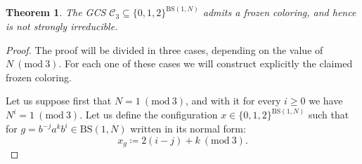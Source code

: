 \documentclass[letterpaper,10pt]{amsart}
\theoremstyle{plain}
\newtheorem{theorem}{Theorem}[section]
\newcommand{\BS}[1][N]{\mathrm{BS}(1,#1)}
\begin{document}
\begin{theorem}\label{thm:existence_frozen_3} The GCS $\mathcal{C}_3\subseteq \{0,1,2\}^{\BS}$ admits a frozen coloring, and hence is not strongly irreducible.
\end{theorem}
\begin{proof}The proof will be divided in three cases, depending on the value of $N \ (\mathrm{mod} \ 3)$. For each one of these cases we will construct explicitly the claimed frozen coloring.
	
	Let us suppose first that $N=1 \ (\mathrm{mod} \ 3)$, and with it for every $i\ge 0$ we have $N^i=1 \ (\mathrm{mod} \ 3)$.
	Let us define the configuration $x\in \{0,1,2\}^{\BS}$ such that for $g=b^{-j}a^k b^i\in \BS$ written in its normal form:
	$$
	x_g\coloneqq 2(i-j)+k \ (\mathrm{mod} \ 3).
	$$
	

\end{proof}
\end{document}
